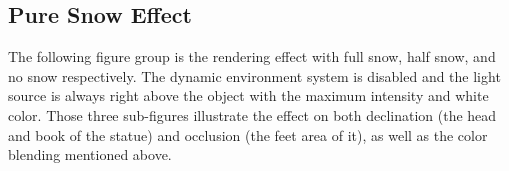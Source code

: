 \documentclass{article}
\begin{document}
\subsection {Pure Snow Effect}
The following figure group is the rendering effect with full snow, half snow, and no snow respectively.
The dynamic environment system is disabled and the light source is always right above the object with
the maximum intensity and white color. Those three sub-figures illustrate the effect on both declination 
(the head and book of the statue) and occlusion (the feet area of it), as well as the color blending
mentioned above.

\begin{figure}[h]
  \centering
  \hfill
\end{figure}
\end{document}
